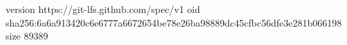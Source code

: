 version https://git-lfs.github.com/spec/v1
oid sha256:6a6a913420c6e6777a6672654be78e26ba98889dc45cfbc56dfe3e281b066198
size 89389
